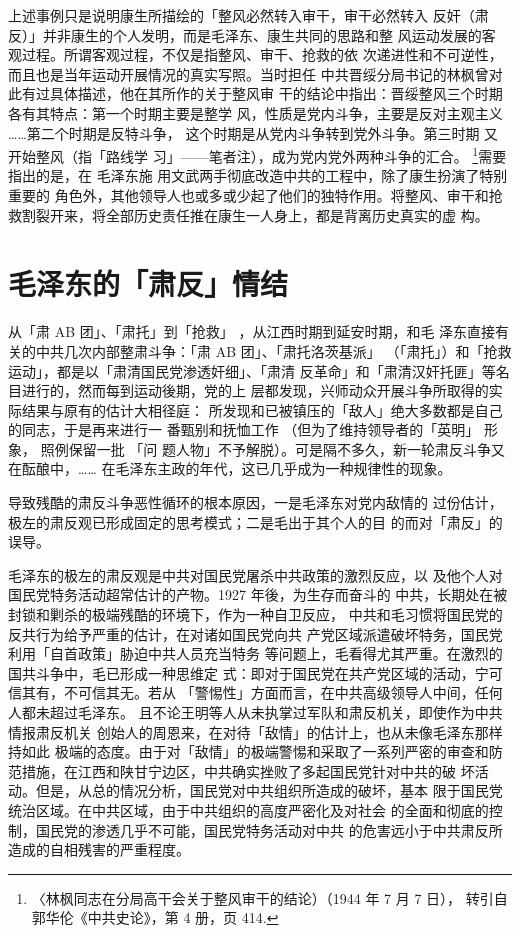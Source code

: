 上述事例只是说明康生所描绘的「整风必然转入审干，审干必然转入 反奸（肃
反）」并非康生的个人发明，而是毛泽东、康生共同的思路和整 风运动发展的客
观过程。所谓客观过程，不仅是指整风、审干、抢救的依 次递进性和不可逆性，
而且也是当年运动开展情况的真实写照。当时担任 中共晋绥分局书记的林枫曾对
此有过具体描述，他在其所作的关于整风审 干的结论中指出：晋绥整风三个时期
各有其特点：第一个时期主要是整学 风，性质是党内斗争，主要是反对主观主义
……第二个时期是反特斗争， 这个时期是从党内斗争转到党外斗争。第三时期
又开始整风（指「路线学 习」——笔者注），成为党内党外两种斗争的汇合。
\footnote{〈林枫同志在分局高干会关于整风审干的结论）（1944 年 7 月 7 日），
转引自郭华伦《中共史论》，第 4 册，页 414.}需要指出的是，在 毛泽东施
用文武两手彻底改造中共的工程中，除了康生扮演了特别重要的
角色外，其他领导人也或多或少起了他们的独特作用。将整风、审干和抢
救割裂开来，将全部历史责任推在康生一人身上，都是背离历史真实的虚
构。

\section{毛泽东的「肃反」情结}

从「肃 AB 团」、「肃托」到「抢救」
，从江西时期到延安时期，和毛
泽东直接有关的中共几次内部整肃斗争：「肃 AB 团」、「肃托洛茨基派」
（「肃托」）和「抢救运动」，都是以「肃清国民党渗透奸细」、「肃清
反革命」和「肃清汉奸托匪」等名目进行的，然而每到运动後期，党的上
层都发现，兴师动众开展斗争所取得的实际结果与原有的估计大相径庭：
所发现和已被镇压的「敌人」绝大多数都是自己的同志，于是再来进行一
番甄别和抚恤工作
（但为了维持领导者的「英明」
形象，
照例保留一批
「问
题人物」不予解脱）。可是隔不多久，新一轮肃反斗争又在酝酿中，……
在毛泽东主政的年代，这已几乎成为一种规律性的现象。

导致残酷的肃反斗争恶性循环的根本原因，一是毛泽东对党内敌情的
过份估计，极左的肃反观已形成固定的思考模式；二是毛出于其个人的目
的而对「肃反」的误导。

毛泽东的极左的肃反观是中共对国民党屠杀中共政策的激烈反应，以
及他个人对国民党特务活动超常估计的产物。1927 年後，为生存而奋斗的
中共，长期处在被封锁和剿杀的极端残酷的环境下，作为一种自卫反应，
中共和毛习惯将国民党的反共行为给予严重的估计，在对诸如国民党向共
产党区域派遣破坏特务，国民党利用「自首政策」胁迫中共人员充当特务
等问题上，毛看得尤其严重。在激烈的国共斗争中，毛已形成一种思维定
式：即对于国民党在共产党区域的活动，宁可信其有，不可信其无。若从
「警惕性」方面而言，在中共高级领导人中间，任何人都未超过毛泽东。
且不论王明等人从未执掌过军队和肃反机关，即使作为中共情报肃反机关
创始人的周恩来，在对待「敌情」的估计上，也从未像毛泽东那样持如此
极端的态度。由于对「敌情」的极端警惕和采取了一系列严密的审查和防
范措施，在江西和陕甘宁边区，中共确实挫败了多起国民党针对中共的破
坏活动。但是，从总的情况分析，国民党对中共组织所造成的破坏，基本
限于国民党统治区域。在中共区域，由于中共组织的高度严密化及对社会
的全面和彻底的控制，国民党的渗透几乎不可能，国民党特务活动对中共
的危害远小于中共肃反所造成的自相残害的严重程度。

